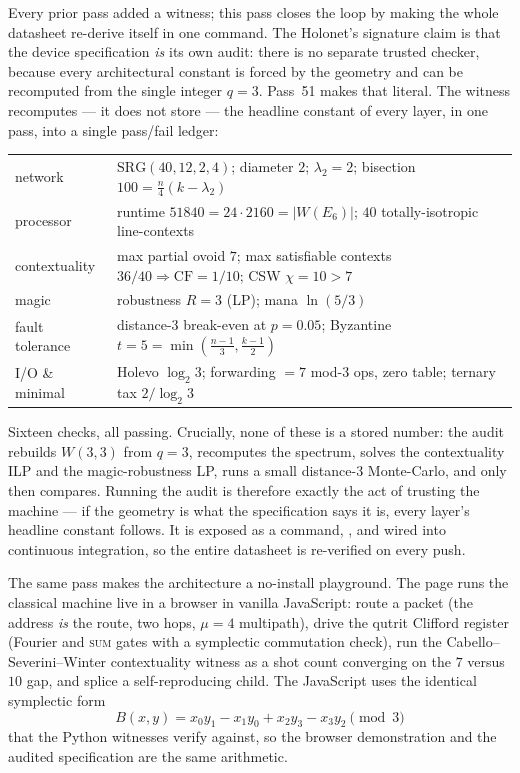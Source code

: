 \documentclass[11pt]{article}
\begin{document}
Every prior pass added a witness; this pass closes the loop by making the whole
datasheet re-derive itself in one command.  The Holonet's signature claim is
that the device specification \emph{is} its own audit: there is no separate
trusted checker, because every architectural constant is forced by the geometry
and can be recomputed from the single integer \(q=3\).  Pass~51 makes that
literal.  The witness  recomputes --- it does
not store --- the headline constant of every layer, in one pass, into a single
pass/fail ledger:
\begin{center}
\begin{tabular}{ll}
network & \(\mathrm{SRG}(40,12,2,4)\); diameter \(2\); \(\lambda_2=2\); bisection \(100=\tfrac{n}{4}(k-\lambda_2)\)\\
processor & runtime \(51840=24\cdot2160=|W(E_6)|\); \(40\) totally-isotropic line-contexts\\
contextuality & max partial ovoid \(7\); max satisfiable contexts \(36/40\Rightarrow \mathrm{CF}=1/10\); CSW \(\chi=10>7\)\\
magic & robustness \(R=3\) (LP); mana \(\ln(5/3)\)\\
fault tolerance & distance-\(3\) break-even at \(p=0.05\); Byzantine \(t=5=\min(\tfrac{n-1}{3},\tfrac{k-1}{2})\)\\
I/O \& minimal & Holevo \(\log_2 3\); forwarding \(=7\) mod-\(3\) ops, zero table; ternary tax \(2/\log_2 3\)
\end{tabular}
\end{center}
Sixteen checks, all passing.  Crucially, none of these is a stored number: the
audit rebuilds \(W(3,3)\) from \(q=3\), recomputes the spectrum, solves the
contextuality ILP and the magic-robustness LP, runs a small distance-\(3\)
Monte-Carlo, and only then compares.  Running the audit is therefore exactly the
act of trusting the machine --- if the geometry is what the specification says it
is, every layer's headline constant follows.  It is exposed as a command,
, and wired into continuous integration, so the entire
datasheet is re-verified on every push.

The same pass makes the architecture a no-install playground.  The page
 runs the classical machine live in a browser in vanilla
JavaScript: route a packet (the address \emph{is} the route, two hops, \(\mu=4\)
multipath), drive the qutrit Clifford register (Fourier and \textsc{sum} gates
with a symplectic commutation check), run the Cabello--Severini--Winter
contextuality witness as a shot count converging on the \(7\) versus \(10\) gap,
and splice a self-reproducing child.  The JavaScript uses the identical
symplectic form
\[
  B(x,y)=x_0y_1-x_1y_0+x_2y_3-x_3y_2\pmod 3
\]
that the Python witnesses verify against, so the browser demonstration and the
audited specification are the same arithmetic.
\end{document}
